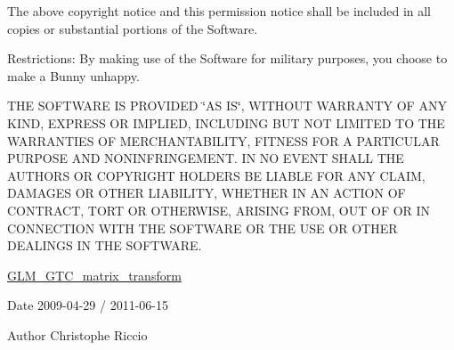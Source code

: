 The above copyright notice and this permission notice shall be included in all copies or substantial portions of the Software.

Restrictions\-: By making use of the Software for military purposes, you choose to make a Bunny unhappy.

T\-H\-E S\-O\-F\-T\-W\-A\-R\-E I\-S P\-R\-O\-V\-I\-D\-E\-D \char`\"{}\-A\-S I\-S\char`\"{}, W\-I\-T\-H\-O\-U\-T W\-A\-R\-R\-A\-N\-T\-Y O\-F A\-N\-Y K\-I\-N\-D, E\-X\-P\-R\-E\-S\-S O\-R I\-M\-P\-L\-I\-E\-D, I\-N\-C\-L\-U\-D\-I\-N\-G B\-U\-T N\-O\-T L\-I\-M\-I\-T\-E\-D T\-O T\-H\-E W\-A\-R\-R\-A\-N\-T\-I\-E\-S O\-F M\-E\-R\-C\-H\-A\-N\-T\-A\-B\-I\-L\-I\-T\-Y, F\-I\-T\-N\-E\-S\-S F\-O\-R A P\-A\-R\-T\-I\-C\-U\-L\-A\-R P\-U\-R\-P\-O\-S\-E A\-N\-D N\-O\-N\-I\-N\-F\-R\-I\-N\-G\-E\-M\-E\-N\-T. I\-N N\-O E\-V\-E\-N\-T S\-H\-A\-L\-L T\-H\-E A\-U\-T\-H\-O\-R\-S O\-R C\-O\-P\-Y\-R\-I\-G\-H\-T H\-O\-L\-D\-E\-R\-S B\-E L\-I\-A\-B\-L\-E F\-O\-R A\-N\-Y C\-L\-A\-I\-M, D\-A\-M\-A\-G\-E\-S O\-R O\-T\-H\-E\-R L\-I\-A\-B\-I\-L\-I\-T\-Y, W\-H\-E\-T\-H\-E\-R I\-N A\-N A\-C\-T\-I\-O\-N O\-F C\-O\-N\-T\-R\-A\-C\-T, T\-O\-R\-T O\-R O\-T\-H\-E\-R\-W\-I\-S\-E, A\-R\-I\-S\-I\-N\-G F\-R\-O\-M, O\-U\-T O\-F O\-R I\-N C\-O\-N\-N\-E\-C\-T\-I\-O\-N W\-I\-T\-H T\-H\-E S\-O\-F\-T\-W\-A\-R\-E O\-R T\-H\-E U\-S\-E O\-R O\-T\-H\-E\-R D\-E\-A\-L\-I\-N\-G\-S I\-N T\-H\-E S\-O\-F\-T\-W\-A\-R\-E.

\hyperlink{group__gtc__matrix__transform}{G\-L\-M\-\_\-\-G\-T\-C\-\_\-matrix\-\_\-transform}

\begin{DoxyDate}{Date}
2009-\/04-\/29 / 2011-\/06-\/15 
\end{DoxyDate}
\begin{DoxyAuthor}{Author}
Christophe Riccio 
\end{DoxyAuthor}

